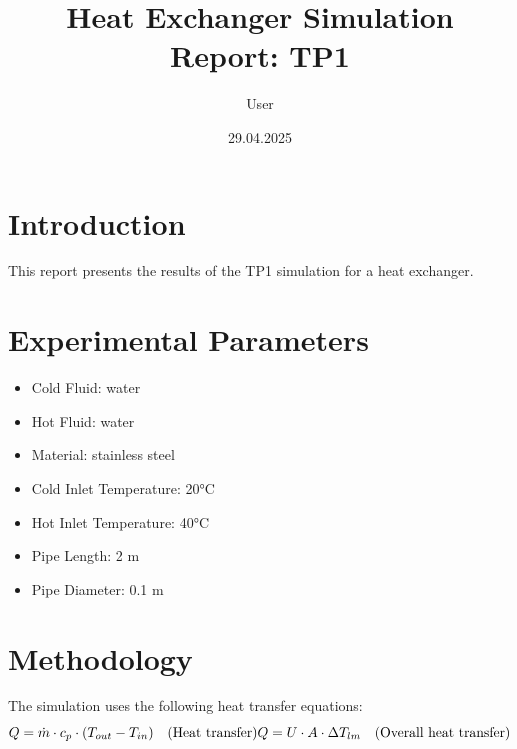 \documentclass[12pt]{article}
\title{Heat Exchanger Simulation Report: TP1}
\author{User}
\date{29.04.2025}
\begin{document}
\maketitle
\tableofcontents

\section{Introduction}
This report presents the results of the TP1 simulation for a heat exchanger.

\section{Experimental Parameters}
\begin{itemize}
    \setlength\itemsep{-0.5em}
    \item Cold Fluid: water
    \item Hot Fluid: water
    \item Material: stainless steel
    \item Cold Inlet Temperature: 20°C
    \item Hot Inlet Temperature: 40°C
    \item Pipe Length: 2 m
    \item Pipe Diameter: 0.1 m
\end{itemize}\n
\section{Methodology}
The simulation uses the following heat transfer equations:
\begin{equation}\label{eq:tp1_heat_transfer}

    Q = \dot{m} \cdot c_p \cdot (T_{out} - T_{in}) \quad \text{(Heat transfer)} \\
    Q = U \cdot A \cdot \Delta T_{lm} \quad \text{(Overall heat transfer)}
    
\end{equation}\n
\end{document}
